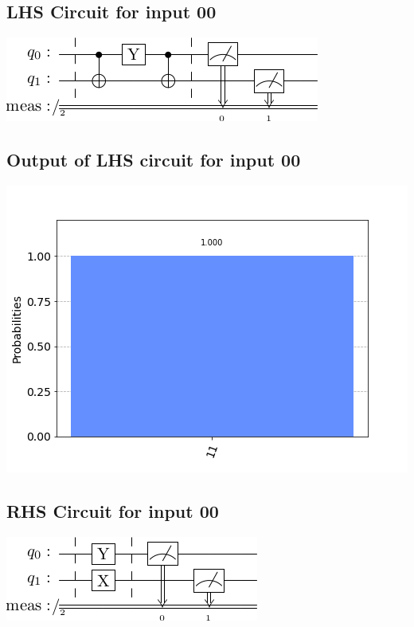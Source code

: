 \documentclass[a4paper]{article}
\begin{document}
    \begin{answer}[Question 1 b (d)]
        \subsection*{LHS Circuit for input 00}
        \includegraphics[scale=0.5]{d100.png}
        \subsection*{Output of LHS circuit for input 00}
        \includegraphics[scale = 0.5]{d100-out.png}
        \subsection*{RHS Circuit for input 00}
        \includegraphics[scale=0.5]{d200.png}

\end{answer}
\end{document}
